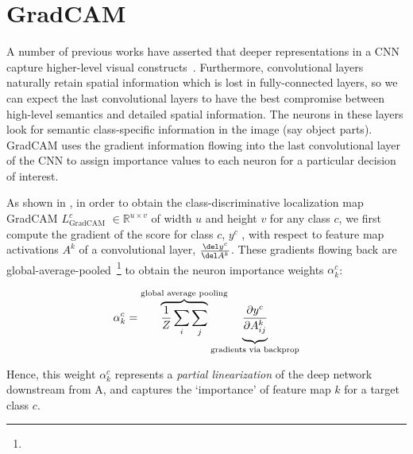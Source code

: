 \vspace{-10pt}
\section{GradCAM}\label{sec:approach}
A number of previous works have asserted that deeper representations in a CNN capture higher-level visual constructs~\cite{bengio2013representation,mahendran2016visualizing}.
Furthermore, convolutional layers naturally retain spatial information which is lost in fully-connected layers, so we can expect the last convolutional layers to have the best compromise between high-level semantics and detailed spatial information.
The neurons in these layers look for semantic class-specific information in the image (say object parts).
GradCAM uses the gradient information flowing into the last convolutional layer
of the CNN to assign importance values to each neuron for a particular decision of interest.

As shown in , in order to obtain the class-discriminative localization map GradCAM
$L_{\text{GradCAM}}^c$ $\in \mathbb{R}^{u \times v}$ of width $u$ and height $v$ for any class $c$,
we first compute the gradient
of the score for class $c$, $y^c$ , with respect to feature map
activations $A^k$ of a convolutional layer, \ie $\frac{\del y^c}{\del A^k}$.
These gradients flowing back are global-average-pooled~\footnote{}
to obtain the neuron importance weights $\alpha{}_{k}^c$:
\begin{center}
\begin{equation} \label{eq:alpha1}
    \alpha{}_{k}^c =
    \overbrace{
        \frac{1}{Z}\sum_{i}\sum_{j}
    }^{\text{global average pooling}}
    \hspace{-17pt}
    \underbrace{
        \vphantom{\sum_{i}\sum_{j}} \frac{\partial y^c}{\partial A_{ij}^{k}}
    }_{\text{gradients via backprop}}
\end{equation}
\end{center}
Hence, this weight $\alpha{}_{k}^c$ represents a \emph{partial linearization} of the deep network downstream from A,
and captures the `importance' of feature map $k$ for a target class $c$. 

